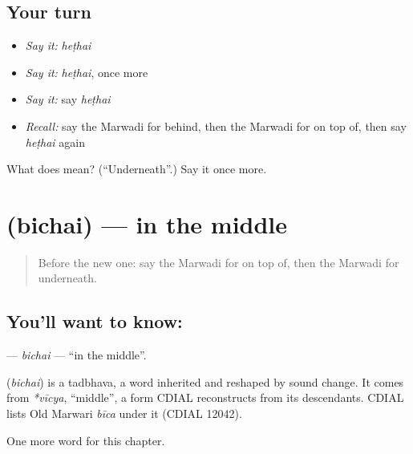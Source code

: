 \subsection*{Your turn}
\begin{itemize}
\raggedright
  \item \emph{Say it:} \emph{heṭhai}
  \item \emph{Say it:} \emph{heṭhai}, once more
  \item \emph{Say it:} say \emph{heṭhai}
  \item \emph{Recall:} say the Marwadi for behind, then the Marwadi for on top of, then say \emph{heṭhai} again
\end{itemize}

\begin{tcolorbox}[breakable,colback=teal!4,colframe=teal!35!black,title={Before you move on}]
What does  mean? (\textquotedblleft{}Underneath\textquotedblright{}.) Say it once more.
\end{tcolorbox}
\section[\texorpdfstring{\mw{बिचै} (bichai)}{बिचै (bichai)}]{ (bichai) — in the middle}

\label{lesson:MW-C97-bichai}



\begin{quote}
Before the new one: say the Marwadi for on top of, then the Marwadi for underneath.
\end{quote}

\subsection*{You'll want to know: }
\textbf{} — \emph{bichai} — \textquotedblleft{}in the middle\textquotedblright{}.

\begin{cousinweb}
\textbf{} (\emph{bichai}) is a tadbhava, a word inherited and reshaped by sound change. It comes from \emph{*vīcya}, \textquotedblleft{}middle\textquotedblright{}, a form CDIAL reconstructs from its descendants. CDIAL lists Old Marwari \emph{bīca} under it (CDIAL 12042).
\end{cousinweb}

\begin{grammarlens}[title={What you've built}]
One more word for this chapter.
\end{grammarlens}


